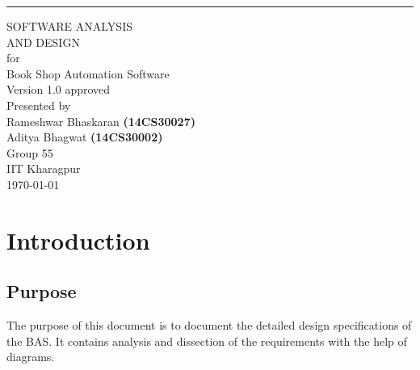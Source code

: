 \documentclass{scrreprt}
\date{}
\def\myversion{1.0 }
\begin{document}
\begin{flushright}
    \rule{16cm}{5pt}\vskip1cm
    \begin{bfseries}
        \Huge{SOFTWARE ANALYSIS\\ AND DESIGN}\\
        \vspace{1.9cm}
        for\\
        \vspace{1.9cm}
        Book Shop Automation Software\\
        \vspace{1.9cm}
        \LARGE{Version \myversion approved}\\
        \vspace{1.8cm}
        Presented by\\
        \vspace{0.5cm}
        Rameshwar Bhaskaran \textbf{(14CS30027)} \\
        Aditya Bhagwat \textbf{(14CS30002)} \\
        Group 55\\
        \vspace{1.3cm}
        IIT Kharagpur\\    
       
        \today\\
    \end{bfseries}
\end{flushright}

\tableofcontents


\chapter{Introduction}
\section{Purpose}
The purpose of this document is to document the detailed design specifications of the BAS. It contains analysis and dissection of the requirements with the help of diagrams.
\end{document}
